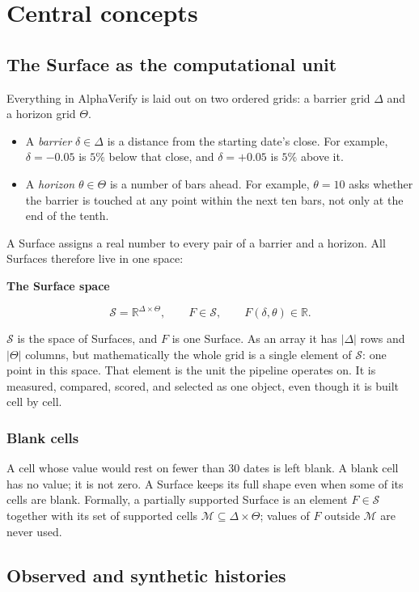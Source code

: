 \documentclass[11pt]{article}
\newcommand{\topic}[1]{\Needspace{6\baselineskip}\subsubsection*{#1}}
\newenvironment{keyconcept}[1]{%
  \par\addvspace{8pt}\begin{lrbox}{\conceptbox}%
  \begin{minipage}{\dimexpr\linewidth-24pt\relax}%
  \setlength{\parindent}{0pt}%
  {\normalsize\bfseries\color{ConceptInk}#1\par}\large
}{%
  \end{minipage}\end{lrbox}%
  \noindent{\setlength{\fboxsep}{12pt}%
  \colorbox{ConceptPaper}{\usebox{\conceptbox}}}\par\addvspace{8pt}}
\begin{document}
\section{Central concepts}\label{sec:surface}

\subsection{The Surface as the computational unit}

Everything in AlphaVerify is laid out on two ordered grids: a barrier grid
$\Delta$ and a horizon grid $\Theta$.
\begin{itemize}
 \item A \emph{barrier} $\delta\in\Delta$ is a distance from the starting
       date's close. For example, $\delta=-0.05$ is $5\%$ below that close,
       and $\delta=+0.05$ is $5\%$ above it.
 \item A \emph{horizon} $\theta\in\Theta$ is a number of bars ahead. For
       example, $\theta=10$ asks whether the barrier is touched at any point
       within the next ten bars, not only at the end of the tenth.
\end{itemize}
A Surface assigns a real number to every pair of a barrier and a horizon.
All Surfaces therefore live in one space:
\begin{keyconcept}{The Surface space}
\[
  \mathcal S=\mathbb R^{\Delta\times\Theta},
  \qquad F\in\mathcal S,
  \qquad F(\delta,\theta)\in\mathbb R.
\]
\end{keyconcept}
$\mathcal S$ is the space of Surfaces, and $F$ is one Surface. As an array
it has $|\Delta|$ rows and $|\Theta|$ columns, but mathematically the whole
grid is a single element of $\mathcal S$: one point in this space. That
element is the unit the pipeline operates on. It is measured, compared,
scored, and selected as one object, even though it is built cell by cell.

\topic{Blank cells}

A cell whose value would rest on fewer than 30 dates is left blank. A blank
cell has no value; it is not zero. A Surface keeps its full shape even when
some of its cells are blank. Formally, a partially supported Surface is an
element $F\in\mathcal S$ together with its set of supported cells
$\mathcal M\subseteq\Delta\times\Theta$; values of $F$ outside $\mathcal M$
are never used.

\subsection{Observed and synthetic histories}\label{sec:paths}
\end{document}
